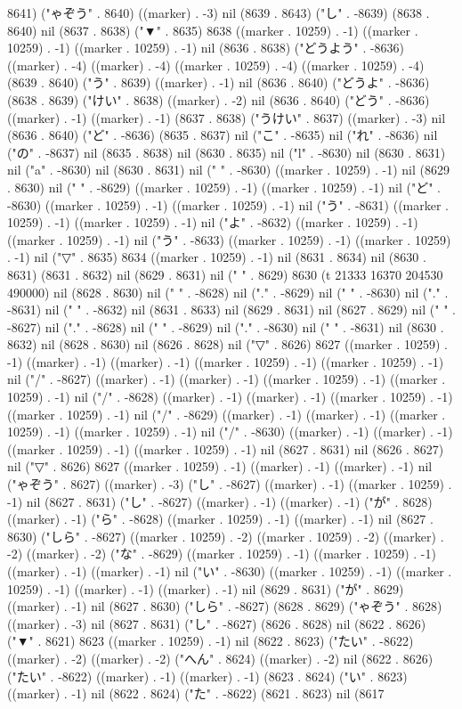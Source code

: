 {{8641) ("ゃぞう" . 8640) ((marker) . -3) nil (8639 . 8643) ("し" . -8639) (8638 . 8640) nil (8637 . 8638) ("▼" . 8635) 8638 ((marker . 10259) . -1) ((marker . 10259) . -1) ((marker . 10259) . -1) nil (8636 . 8638) ("どうよう" . -8636) ((marker) . -4) ((marker) . -4) ((marker . 10259) . -4) ((marker . 10259) . -4) (8639 . 8640) ("う" . 8639) ((marker) . -1) nil (8636 . 8640) ("どうよ" . -8636) (8638 . 8639) ("けい" . 8638) ((marker) . -2) nil (8636 . 8640) ("どう" . -8636) ((marker) . -1) ((marker) . -1) (8637 . 8638) ("うけい" . 8637) ((marker) . -3) nil (8636 . 8640) ("ど" . -8636) (8635 . 8637) nil ("こ" . -8635) nil ("れ" . -8636) nil ("の" . -8637) nil (8635 . 8638) nil (8630 . 8635) nil ("l" . -8630) nil (8630 . 8631) nil ("a" . -8630) nil (8630 . 8631) nil (" " . -8630) ((marker . 10259) . -1) nil (8629 . 8630) nil ("
" . -8629) ((marker . 10259) . -1) ((marker . 10259) . -1) nil ("ど" . -8630) ((marker . 10259) . -1) ((marker . 10259) . -1) nil ("う" . -8631) ((marker . 10259) . -1) ((marker . 10259) . -1) nil ("よ" . -8632) ((marker . 10259) . -1) ((marker . 10259) . -1) nil ("う" . -8633) ((marker . 10259) . -1) ((marker . 10259) . -1) nil ("▽" . 8635) 8634 ((marker . 10259) . -1) nil (8631 . 8634) nil (8630 . 8631) (8631 . 8632) nil (8629 . 8631) nil (" " . 8629) 8630 (t 21333 16370 204530 490000) nil (8628 . 8630) nil (" " . -8628) nil ("." . -8629) nil (" " . -8630) nil ("." . -8631) nil (" " . -8632) nil (8631 . 8633) nil (8629 . 8631) nil (8627 . 8629) nil (" " . -8627) nil ("." . -8628) nil (" " . -8629) nil ("." . -8630) nil (" " . -8631) nil (8630 . 8632) nil (8628 . 8630) nil (8626 . 8628) nil ("▽" . 8626) 8627 ((marker . 10259) . -1) ((marker) . -1) ((marker) . -1) ((marker . 10259) . -1) ((marker . 10259) . -1) nil ("/" . -8627) ((marker) . -1) ((marker) . -1) ((marker . 10259) . -1) ((marker . 10259) . -1) nil ("/" . -8628) ((marker) . -1) ((marker) . -1) ((marker . 10259) . -1) ((marker . 10259) . -1) nil ("/" . -8629) ((marker) . -1) ((marker) . -1) ((marker . 10259) . -1) ((marker . 10259) . -1) nil ("/" . -8630) ((marker) . -1) ((marker) . -1) ((marker . 10259) . -1) ((marker . 10259) . -1) nil (8627 . 8631) nil (8626 . 8627) nil ("▽" . 8626) 8627 ((marker . 10259) . -1) ((marker) . -1) ((marker) . -1) nil ("ゃぞう" . 8627) ((marker) . -3) ("し" . -8627) ((marker) . -1) ((marker . 10259) . -1) nil (8627 . 8631) ("し" . -8627) ((marker) . -1) ((marker) . -1) ("が" . 8628) ((marker) . -1) ("ら" . -8628) ((marker . 10259) . -1) ((marker) . -1) nil (8627 . 8630) ("しら" . -8627) ((marker . 10259) . -2) ((marker . 10259) . -2) ((marker) . -2) ((marker) . -2) ("な" . -8629) ((marker . 10259) . -1) ((marker . 10259) . -1) ((marker) . -1) ((marker) . -1) nil ("い" . -8630) ((marker . 10259) . -1) ((marker . 10259) . -1) ((marker) . -1) ((marker) . -1) nil (8629 . 8631) ("が" . 8629) ((marker) . -1) nil (8627 . 8630) ("しら" . -8627) (8628 . 8629) ("ゃぞう" . 8628) ((marker) . -3) nil (8627 . 8631) ("し" . -8627) (8626 . 8628) nil (8622 . 8626) ("▼" . 8621) 8623 ((marker . 10259) . -1) nil (8622 . 8623) ("たい" . -8622) ((marker) . -2) ((marker) . -2) ("へん" . 8624) ((marker) . -2) nil (8622 . 8626) ("たい" . -8622) ((marker) . -1) ((marker) . -1) (8623 . 8624) ("い" . 8623) ((marker) . -1) nil (8622 . 8624) ("た" . -8622) (8621 . 8623) nil (8617 }}
